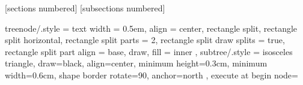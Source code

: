 



[sections numbered]
[subsections numbered]

\usepackage{fontspec}
\setmonofont{M+ 1mn}
\usepackage{algorithm2e}
\usepackage{verbatim}
\usepackage[font=scriptsize,labelfont=bf]{caption}
\usepackage{subcaption}
\usepackage{environ}

\newcommand\Wider[2][4.5em]{%
\makebox[\linewidth][c]{%
  \begin{minipage}{\dimexpr\textwidth+#1\relax}
  #2
  \end{minipage}%
  }%
}

\usepackage{tikz}  %
\usetikzlibrary{
  shapes.multipart,
  shapes.geometric,
  arrows,
  fit,
  matrix,
  positioning,
  shapes.callouts,
  shapes.arrows,
  calc,
  trees,
}
\tikzset
{
    treenode/.style = {
        text width = 0.5em, align = center,
        rectangle split,
        rectangle split horizontal,
        rectangle split parts = 2,
        rectangle split draw splits = true,
        rectangle split part align = base,
        draw, fill = inner
    },
    subtree/.style = {
        isosceles triangle, draw=black, align=center,
        minimum height=0.3cm, minimum width=0.6cm,
        shape border rotate=90, anchor=north
    },
    execute at begin node=\strut
}


